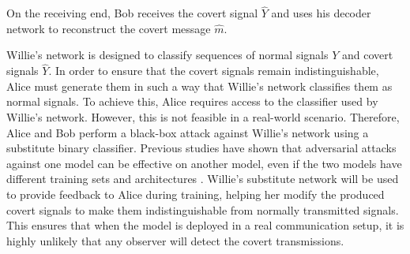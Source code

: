On the receiving end, Bob receives the covert signal \(\hat{Y}\) and uses his decoder network to reconstruct the covert message \(\hat{m}\).

Willie's network is designed to classify sequences of normal signals \(Y\) and covert signals \(\hat{Y}\). In order to ensure that the covert signals remain indistinguishable, Alice must generate them in such a way that Willie's network classifies them as normal signals. To achieve this, Alice requires access to the classifier used by Willie's network. However, this is not feasible in a real-world scenario. Therefore, Alice and Bob perform a black-box attack against Willie's network using a substitute binary classifier. Previous studies have shown that adversarial attacks against one model can be effective on another model, even if the two models have different training sets and architectures \cite{papernot2016transferability}. Willie's substitute network will be used to provide feedback to Alice during training, helping her modify the produced covert signals to make them indistinguishable from normally transmitted signals. This ensures that when the model is deployed in a real communication setup, it is highly unlikely that any observer will detect the covert transmissions.

